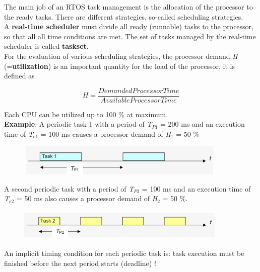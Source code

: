 The main job of an RTOS task management is the allocation of the processor to the ready tasks. There are different strategies, so-called scheduling strategies.\\

A \textbf{real-time scheduler} must divide all ready (runnable) tasks to the processor, so that all all time conditions are met. The set of tasks managed by the real-time scheduler is called \textbf{taskset}.\\

For the evaluation of various scheduling strategies, the processor demand \textit{H} (=\textbf{utilization}) is an important quantity for the load of the processor, it is defined as

\begin{equation}
	H = \frac{Demanded Processor Time}{Available Processor Time}
\label{EQ 3}
\end{equation}

Each CPU can be utilized up to 100 \% at maximum.\\

\textbf{Example}: A periodic task 1 with a period of \textit{T}${}_{P1}$ = 200 ms and an execution time of \textit{T}${}_{e1}$ = 100 ms causes a processor demand of \textit{H}${}_{1}$ = 50 \%

	\begin{figure}[h]
    \centering
    \includegraphics[width=10cm, height=1.5cm]{Images/image83.png}
    \label{fig:Fig }
    \end{figure}

A second periodic task with a period of \textit{T}${}_{P2}$ = 100 ms and an execution time of \textit{T}${}_{e2}$ = 50 ms also causes a processor demand of \textit{H}${}_{2}$ = 50 \%.

	\begin{figure}[h]
    \centering
    \includegraphics[width=10cm, height=1.5cm]{Images/image84.png}
    \label{fig:Fig }
    \end{figure} 

An implicit timing condition for each periodic task is: task execution must be finished before the next period starts (deadline) !\\

